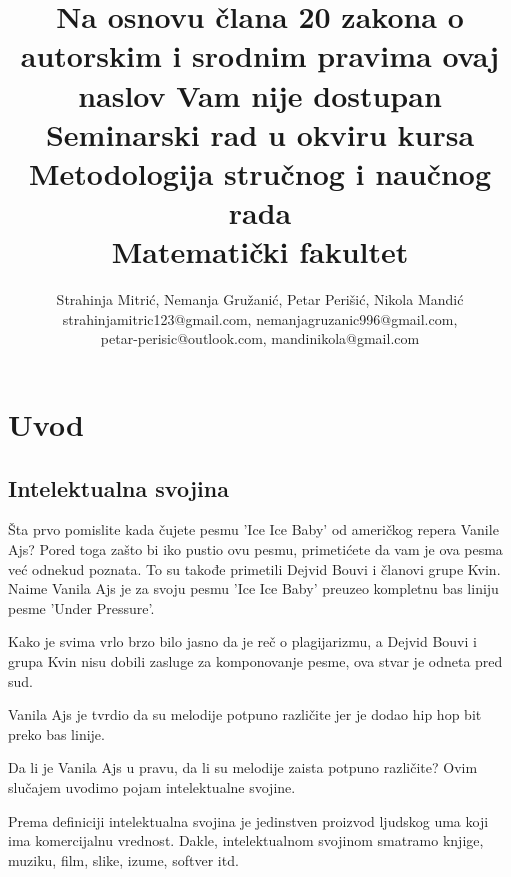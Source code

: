 \documentclass[a4paper]{article}
\begin{document}
\title{Na osnovu člana 20 zakona o autorskim i srodnim pravima ovaj naslov Vam nije dostupan\\
\large Seminarski rad u okviru kursa\\Metodologija stručnog i naučnog rada\\ Matematički fakultet}

\author{Strahinja Mitrić, Nemanja Gružanić, Petar Perišić, Nikola Mandić\\ strahinjamitric123@gmail.com, nemanjagruzanic996@gmail.com,\\ petar-perisic@outlook.com, mandinikola@gmail.com
}

\maketitle



\tableofcontents

\newpage

\section{Uvod}
\label{sec:uvod}
\subsection{Intelektualna svojina}
Šta prvo pomislite kada čujete pesmu 'Ice Ice Baby' od američkog repera Vanile Ajs?
Pored toga zašto bi iko pustio ovu pesmu, primetićete da vam je ova pesma već odnekud poznata.
To su takođe primetili Dejvid Bouvi i članovi grupe Kvin.
Naime Vanila Ajs je za svoju pesmu 'Ice Ice Baby' preuzeo kompletnu bas liniju pesme 'Under Pressure'.

Kako je svima vrlo brzo bilo jasno da je reč o plagijarizmu, a Dejvid Bouvi i grupa Kvin nisu dobili
zasluge za komponovanje pesme, ova stvar je odneta pred sud.

Vanila Ajs je tvrdio da su melodije potpuno različite jer je dodao hip hop bit preko bas linije. \cite{rollingstone}

Da li je Vanila Ajs u pravu, da li su melodije zaista potpuno različite? Ovim slučajem uvodimo pojam intelektualne svojine.

Prema definiciji intelektualna svojina je jedinstven proizvod ljudskog uma koji ima komercijalnu vrednost. \cite{texasUniv}
Dakle, intelektualnom svojinom smatramo knjige, muziku, film, slike, izume, softver itd.
\end{document}
